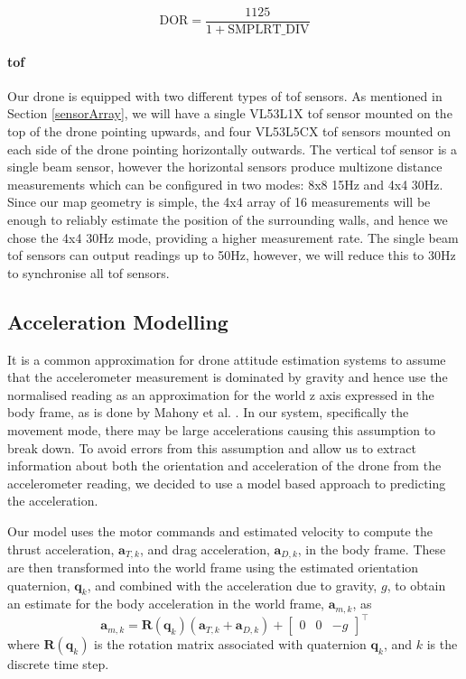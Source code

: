 \documentclass{report_template_oxford}
\begin{document}
\begin{equation} \label{equ:EstSMPLRT_DIV}
    \mathrm{DOR} = \frac{1125}{1 + \mathrm{SMPLRT\_DIV}}
\end{equation}

\paragraph{\gls{tof}}
Our drone is equipped with two different types of \gls{tof} sensors. As mentioned in Section \ref{sensorArray}, we will have a single VL53L1X \gls{tof} sensor \cite{st_vl53l1x} mounted on the top of the drone pointing upwards, and four VL53L5CX \gls{tof} sensors \cite{st_vl53l5cx} mounted on each side of the drone pointing horizontally outwards. The vertical \gls{tof} sensor is a single beam sensor, however the horizontal sensors produce multizone distance measurements which can be configured in two modes: 8x8 15Hz and 4x4 30Hz. Since our map geometry is simple, the 4x4 array of 16 measurements will be enough to reliably estimate the position of the surrounding walls, and hence we chose the 4x4 30Hz mode, providing a higher measurement rate. The single beam \gls{tof} sensors can output readings up to 50Hz, however, we will reduce this to 30Hz to synchronise all \gls{tof} sensors.

\subsection{Acceleration Modelling} \label{StateEstimatorAccelModel}

It is a common approximation for drone attitude estimation systems to assume that the accelerometer measurement is dominated by gravity and hence use the normalised reading as an approximation for the world z axis expressed in the body frame, as is done by Mahony et al. \cite{4608934}. In our system, specifically the movement mode, there may be large accelerations causing this assumption to break down. To avoid errors from this assumption and allow us to extract information about both the orientation and acceleration of the drone from the accelerometer reading, we decided to use a model based approach to predicting the acceleration. 

Our model uses the motor commands and estimated velocity to compute the thrust acceleration, $\mathbf{a}_{T,k}$, and drag acceleration, $\mathbf{a}_{D,k}$, in the body frame. These are then transformed into the world frame using the estimated orientation quaternion, $\mathbf{q}_k$, and combined with the acceleration due to gravity, $g$, to obtain an estimate for the body acceleration in the world frame, $\mathbf{a}_{m,k}$, as 
\begin{equation} \label{equ:EstAccelModel}
    \mathbf{a}_{m,k} = \mathbf{R}(\mathbf{q}_k)(\mathbf{a}_{T,k} + \mathbf{a}_{D,k}) + \begin{bmatrix}
        0 & 0 & -g
    \end{bmatrix}^\top
\end{equation}
where $\mathbf{R}(\mathbf{q}_k)$ is the rotation matrix associated with quaternion $\mathbf{q}_k$, and $k$ is the discrete time step.
\end{document}
